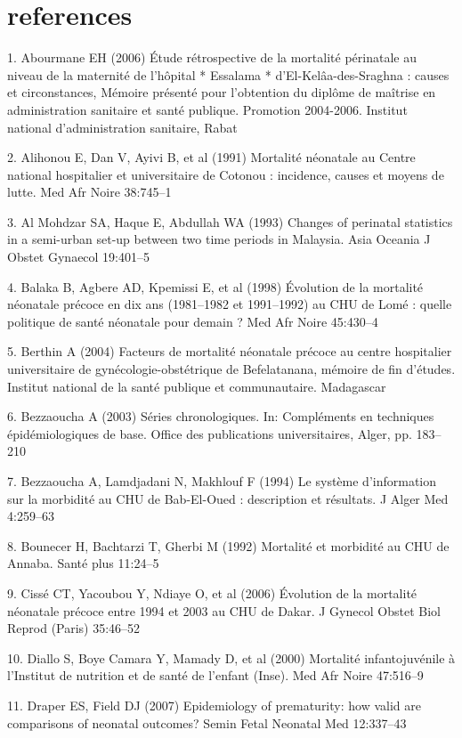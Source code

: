 \section{references}
1. Abourmane EH (2006) Étude rétrospective de la mortalité
périnatale au niveau de la maternité de l’hôpital * Essalama *
d’El-Kelâa-des-Sraghna : causes et circonstances, Mémoire présenté
pour l’obtention du diplôme de maîtrise en administration
sanitaire et santé publique. Promotion 2004-2006. Institut national
d’administration sanitaire, Rabat


2. Alihonou E, Dan V, Ayivi B, et al (1991) Mortalité néonatale au
Centre national hospitalier et universitaire de Cotonou : incidence,
causes et moyens de lutte. Med Afr Noire 38:745–1


3. Al Mohdzar SA, Haque E, Abdullah WA (1993) Changes of
perinatal statistics in a semi-urban set-up between two time
periods in Malaysia. Asia Oceania J Obstet Gynaecol 19:401–5


4. Balaka B, Agbere AD, Kpemissi E, et al (1998) Évolution de la
mortalité néonatale précoce en dix ans (1981–1982 et 1991–1992)
au CHU de Lomé : quelle politique de santé néonatale pour
demain ? Med Afr Noire 45:430–4


5. Berthin A (2004) Facteurs de mortalité néonatale précoce au
centre hospitalier universitaire de gynécologie-obstétrique de
Befelatanana, mémoire de fin d’études. Institut national de la santé
publique et communautaire. Madagascar


6. Bezzaoucha A (2003) Séries chronologiques. In: Compléments en
techniques épidémiologiques de base. Office des publications
universitaires, Alger, pp. 183–210


7. Bezzaoucha A, Lamdjadani N, Makhlouf F (1994) Le système
d’information sur la morbidité au CHU de Bab-El-Oued :
description et résultats. J Alger Med 4:259–63


8. Bounecer H, Bachtarzi T, Gherbi M (1992) Mortalité et morbidité
au CHU de Annaba. Santé plus 11:24–5	
	

9. Cissé CT, Yacoubou Y, Ndiaye O, et al (2006) Évolution de la
mortalité néonatale précoce entre 1994 et 2003 au CHU de Dakar.
J Gynecol Obstet Biol Reprod (Paris) 35:46–52


10. Diallo S, Boye Camara Y, Mamady D, et al (2000) Mortalité
infantojuvénile à l’Institut de nutrition et de santé de l’enfant
(Inse). Med Afr Noire 47:516–9


11. Draper ES, Field DJ (2007) Epidemiology of prematurity: how
valid are comparisons of neonatal outcomes? Semin Fetal
Neonatal Med 12:337–43



